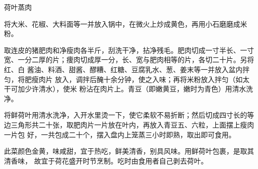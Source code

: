 %
%
%
%
%
%
%
\begin{recipe}{荷叶蒸肉}

\ingredients


\preparation

\step 将大米、花椒、大料面等一并放入锅中，在微火上炒成黄色，再用小石磨磨成米
粉。

\step 取连皮的猪肥肉和净瘦肉各半斤，刮洗干净，拈净残毛。肥肉切成一寸半长、一寸
宽、一分二厚的片；痩肉切成厚一分，长、宽与肥肉相等的片，各切二十片。另将红、白
酱油、料酒、甜酱、醪糟、红糖、豆腐乳水、葱、姜末等一并放入盆内拌匀，将肥瘦肉片
放入，调拌后醃十余分钟，使之入味；再将米粉放入拌匀（如太干可加少许清水），使米
粉沾在肉片上。青豆（即嫩黄豆，嫩时为青色）用清水洗净。

\step 将鲜荷叶用清水洗净，入开水里烫一下，使它柔软不易折断；然后切成四寸长的等
边三角形共二十张，取肥肉片一片放在叶内，再放入青豆五、六粒，上面摆上瘦肉一片包
好，一共包成二十个，摆入盘内上笼蒸三小时即熟，取出即可食用。

\features

此菜颜色金黄，味咸甜，宜于热吃，鲜美清香，别具风味。用鲜荷叶包裹，是取其清香味，
故宜于荷花盛开时节烹制。吃时由食用者自己剥去荷叶。

\end{recipe}

